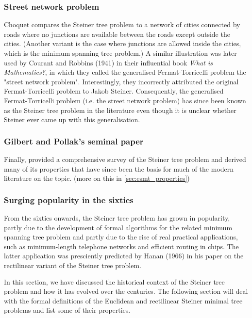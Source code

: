 \documentclass{l4proj}
\begin{document}
\subsubsection{Street network problem}
Choquet compares the Steiner tree problem to a network of cities connected by roads where no junctions are available between the roads except outside the cities. (Another variant is the case where junctions are allowed inside the cities, which is the minimum spanning tree problem.)
A similar illustration was later used by Courant and Robbins (1941) in their influential book \textit{What is Mathematics?}, in which they called the generalised Fermat-Torricelli problem the "street network problem". Interestingly, they incorrectly attributed the original Fermat-Torricelli problem to Jakob Steiner. Consequently, the generalised Fermat-Torricelli problem (i.e. the street network problem) has since been known as the Steiner tree problem in the literature even though it is unclear whether Steiner ever came up with this generalisation.

\subsubsection{Gilbert and Pollak's seminal paper}
Finally, \cite{Gilbert1968SteinerMT} provided a comprehensive survey of the Steiner tree problem and derived many of its properties that have since been the basis for much of the modern literature on the topic. (more on this in \ref{sec:esmt_properties})

\subsubsection{Surging popularity in the sixties}
From the sixties onwards, the Steiner tree problem has grown in popularity, partly due to the development of formal algorithms for the related minimum spanning tree problem and partly due to the rise of real practical applications, such as minimum-length telephone networks and efficient routing in chips. The latter application was presciently predicted by Hanan (1966) in his paper on the rectilinear variant of the Steiner tree problem.

In this section, we have discussed the historical context of the Steiner tree problem and how it has evolved over the centuries. The following section will deal with the formal definitions of the Euclidean and rectilinear Steiner minimal tree problems and list some of their properties.
\end{document}
